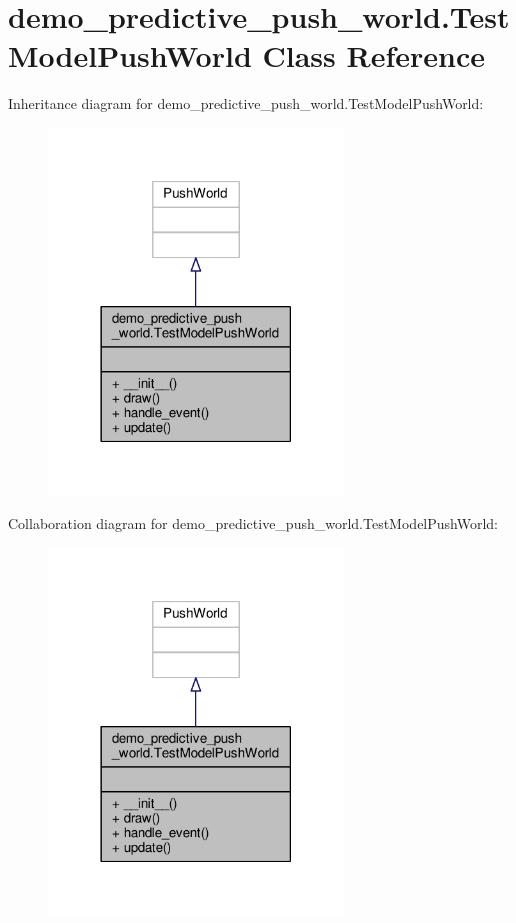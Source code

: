 \hypertarget{classdemo__predictive__push__world_1_1_test_model_push_world}{\section{demo\-\_\-predictive\-\_\-push\-\_\-world.\-Test\-Model\-Push\-World Class Reference}
\label{classdemo__predictive__push__world_1_1_test_model_push_world}
}


Inheritance diagram for demo\-\_\-predictive\-\_\-push\-\_\-world.\-Test\-Model\-Push\-World\-:
\nopagebreak
\begin{figure}[H]
\begin{center}
\leavevmode
\includegraphics[width=222pt]{classdemo__predictive__push__world_1_1_test_model_push_world__inherit__graph}
\end{center}
\end{figure}


Collaboration diagram for demo\-\_\-predictive\-\_\-push\-\_\-world.\-Test\-Model\-Push\-World\-:
\nopagebreak
\begin{figure}[H]
\begin{center}
\leavevmode
\includegraphics[width=222pt]{classdemo__predictive__push__world_1_1_test_model_push_world__coll__graph}
\end{center}
\end{figure}
